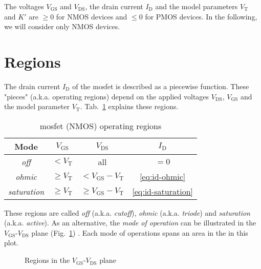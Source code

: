 \documentclass{article}[11pt]
\begin{document}
The voltages $V_{\mathrm{GS}}$ and $V_{\mathrm{DS}}$, the drain current
$I_{\mathrm{D}}$ and the model parameters $V_{\mathrm{T}}$ and $K'$
are $\geq 0$ for NMOS devices and $\leq 0$ for PMOS devices.
In the following, we will consider only NMOS devices.


\section{Regions}

The drain current $I_{\mathrm{D}}$ of the \gls{mosfet} is described as a 
piecewise function.
These "pieces" (a.k.a. operating regions) depend on the applied voltages 
$V_{\mathrm{DS}}$, $V_{\mathrm{GS}}$ and the model parameter 
$V_{\mathrm{T}}$.
Tab.~\ref{tab:regions} explains these regions. 

\begin{table}[H]
\centering
\caption{\gls{mosfet} (NMOS) operating regions}
\begin{tabular}{cccc}
\toprule
Mode                 & $V_{\mathrm{GS}}$     & $V_{\mathrm{DS}}$                    & $I_{\mathrm{D}}$         \\ \midrule
\textit{off}         & $<V_{\mathrm{T}}$     & all                                  & $=0$                     \\ 
\textit{ohmic}       & $\geq V_{\mathrm{T}}$ & $< V_{\mathrm{GS}}-V_{\mathrm{T}}$   & \eqref{eq:id-ohmic}      \\ 
\textit{saturation}  & $\geq V_{\mathrm{T}}$ & $\geq V_{\mathrm{GS}}-V_{\mathrm{T}}$& \eqref{eq:id-saturation} \\ \toprule
\end{tabular}
\label{tab:regions}
\end{table}

These regions are called \textit{off} (a.k.a. \textit{cutoff}), 
\textit{ohmic} (a.k.a. \textit{triode}) 
and \textit{saturation} (a.k.a. \textit{active}).
As an alternative, the \textit{mode of operation} can be illustrated in the
$V_{\mathrm{GS}}$-$V_{\mathrm{DS}}$ plane 
(Fig.~\ref{fig:squarelawregionplot}) .
Each mode of operations spans an area in the in this plot.

\begin{figure}[H]
  \centering
  \begin{tikzpicture}[scale=1.2]
    
  \end{tikzpicture}
  \caption{Regions in the $V_{\mathrm{GS}}$-$V_{\mathrm{DS}}$ plane}
  \label{fig:squarelawregionplot}
\end{figure}
\end{document}

